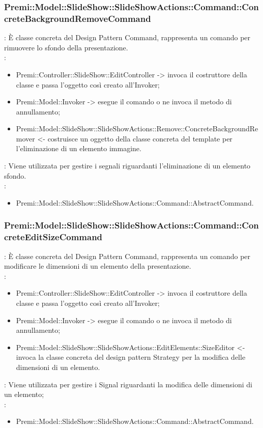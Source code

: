 {                    \subsubsection{Premi::Model::SlideShow::SlideShowActions::Command::ConcreteBackgroundRemoveCommand}{
				\textbf{\tipo}: È classe concreta del Design Pattern Command, rappresenta un comando per rimuovere lo sfondo della presentazione.\\	
				\textbf{\relaz}: 
				\begin{itemize}
					\item Premi::Controller::SlideShow::EditController -> invoca il costruttore della classe e passa l’oggetto così creato all’Invoker;
                    \item Premi::Model::Invoker -> esegue il comando o ne invoca il metodo di annullamento;
                    \item Premi::Model::SlideShow::SlideShowActions::Remove::ConcreteBackgroundRemover <- costruisce un oggetto della classe concreta del  template per l’eliminazione di un elemento immagine.
				\end{itemize}	
                \textbf{\interfacce}: Viene utilizzata per gestire i segnali riguardanti l’eliminazione di un elemento sfondo.\\
                \textbf{\base}: 
                    \begin{itemize}
                    \item Premi::Model::SlideShow::SlideShowActions::Command::AbstractCommand.
                    \end{itemize}
                    }
                        \subsubsection{Premi::Model::SlideShow::SlideShowActions::Command::ConcreteEditSizeCommand}{
				\textbf{\tipo}: È classe concreta del Design Pattern Command, rappresenta un comando per modificare le dimensioni di un elemento della presentazione.\\	
				\textbf{\relaz}: 
				\begin{itemize}
					\item Premi::Controller::SlideShow::EditController -> invoca il costruttore della classe e passa l’oggetto così creato all’Invoker;
                    \item Premi::Model::Invoker -> esegue il comando o ne invoca il metodo di annullamento;
                    \item Premi::Model::SlideShow::SlideShowActions::EditElements::SizeEditor <- invoca la classe concreta del design pattern Strategy per la modifica delle dimensioni di un elemento.
				\end{itemize}	
                \textbf{\interfacce}: Viene utilizzata per gestire i Signal riguardanti la modifica delle dimensioni di un elemento;\\
                \textbf{\base}: 
                    \begin{itemize}
                    \item Premi::Model::SlideShow::SlideShowActions::Command::AbstractCommand.
                    \end{itemize}
                    }
}
